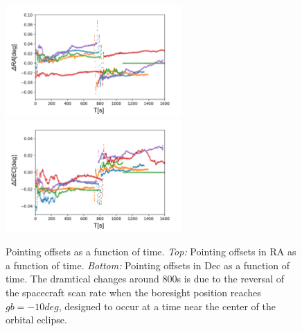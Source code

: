 \documentclass[12pt, preprint]{aastex}
\begin{document}
\begin{figure}[p]
\begin{center}
\includegraphics[width=0.6\textwidth]{figures/all-ra-new}
\includegraphics[width=0.6\textwidth]{figures/all-dec-new}
\end{center}
\caption{%
  \label{pointing}
  Pointing offsets as a function of time.
  \emph{Top:}  Pointing offsets in RA as a function of time.
  \emph{Bottom:} Pointing offsets in Dec as a function of time.
  The dramtical changes around 800s is due to the reversal of the spacecraft scan rate when the boresight position reaches $gb=-10 deg$, designed to occur at a time near the center of the orbital eclipse.
  }
\end{figure}
\end{document}
